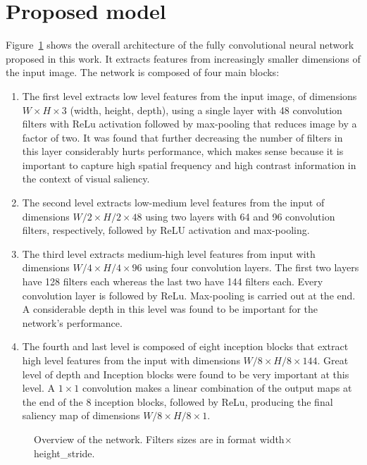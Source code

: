 \documentclass[10pt,twocolumn,letterpaper]{article}
\begin{document}
\section{Proposed model}
Figure~\ref{fig:model} shows the overall architecture of the fully
convolutional neural network proposed in this work.
It extracts features from increasingly smaller dimensions of the
input image.
The network is composed of four main blocks:

\begin{enumerate}
    \item The first level extracts low level features from the input image, of
        dimensions $W\times H \times 3$ (width, height, depth), using
        a single layer with 48 convolution filters with ReLu activation
        followed by max-pooling that reduces image by a factor of two.
        It was found that further decreasing the number of filters in this
        layer considerably hurts performance, which makes sense because it is
        important to capture high spatial frequency and high contrast
        information in the context of visual saliency.
    \item The second level extracts low-medium level features from the
        input of dimensions $W/2 \times H/2 \times 48$ using two layers
        with 64 and 96 convolution filters, respectively, followed by ReLU
        activation and max-pooling.
    \item The third level extracts medium-high level features from input with
        dimensions $W/4 \times H/4 \times 96$ using four convolution layers.
        The first two layers have 128 filters each whereas the last two 
        have 144 filters each.
        Every convolution layer is followed by ReLu.
        Max-pooling is carried out at the end.
        A considerable depth in this level was found to be important for
        the network's performance.
    \item The fourth and last level is composed of eight inception blocks
        that extract high level features from the input with
        dimensions $W/8 \times H/8 \times 144$.
        Great level of depth and Inception blocks were found to be very
        important at this level.
        A $1 \times 1$ convolution makes a linear combination of the output
        maps at the end of the 8 inception blocks, followed by ReLu, producing
        the final saliency map of dimensions $W/8 \times H/8 \times 1$.
\end{enumerate}

\begin{figure}
\begin{center}
\def\svgwidth{1.5\columnwidth}

\label{fig:model}
    \caption{Overview of the network.
        Filters sizes are in format width$\times$height\_stride.}
\end{center}
\end{figure}
\end{document}
